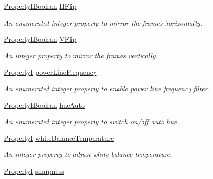 \begin{DoxyCompactItemize}
\hyperlink{group___common_interface_ga44f9437e24b21b6c93da9039ec6786aa}{Property\+I\+Boolean} \hyperlink{classmv_i_m_p_a_c_t_1_1acquire_1_1_camera_settings_v4_l2_device_aae2c24949f727feab82dd57e216445b3}{H\+Flip}
\begin{DoxyCompactList}\small\item\em An enumerated integer property to mirror the frames horizontally. \end{DoxyCompactList}\item 
\hyperlink{group___common_interface_ga44f9437e24b21b6c93da9039ec6786aa}{Property\+I\+Boolean} \hyperlink{classmv_i_m_p_a_c_t_1_1acquire_1_1_camera_settings_v4_l2_device_ac01abfd8789e38a90823409c4908fdc0}{V\+Flip}
\begin{DoxyCompactList}\small\item\em An integer property to mirror the frames vertically. \end{DoxyCompactList}\item 
\hyperlink{group___common_interface_ga12d5e434238ca242a1ba4c6c3ea45780}{Property\+I} \hyperlink{classmv_i_m_p_a_c_t_1_1acquire_1_1_camera_settings_v4_l2_device_a01aacc2f5d328cbef927d6734f44b784}{power\+Line\+Frequency}
\begin{DoxyCompactList}\small\item\em An enumerated integer property to enable power line frequency filter. \end{DoxyCompactList}\item 
\hyperlink{group___common_interface_ga44f9437e24b21b6c93da9039ec6786aa}{Property\+I\+Boolean} \hyperlink{classmv_i_m_p_a_c_t_1_1acquire_1_1_camera_settings_v4_l2_device_a39eef7f0246494e961bcb521f509a874}{hue\+Auto}
\begin{DoxyCompactList}\small\item\em An enumerated integer property to switch on/off auto hue. \end{DoxyCompactList}\item 
\hyperlink{group___common_interface_ga12d5e434238ca242a1ba4c6c3ea45780}{Property\+I} \hyperlink{classmv_i_m_p_a_c_t_1_1acquire_1_1_camera_settings_v4_l2_device_a61292095dc6ec3982c235d053f1b6a92}{white\+Balance\+Temperature}
\begin{DoxyCompactList}\small\item\em An integer property to adjust white balance temperature. \end{DoxyCompactList}\item 
\hyperlink{group___common_interface_ga12d5e434238ca242a1ba4c6c3ea45780}{Property\+I} \hyperlink{classmv_i_m_p_a_c_t_1_1acquire_1_1_camera_settings_v4_l2_device_a419f22340e59abd6212131fde87ae98f}{sharpness}

\end{DoxyCompactItemize}
